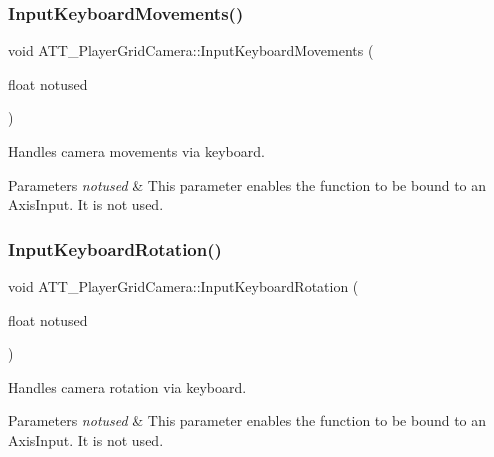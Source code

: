 \subsubsection{\texorpdfstring{InputKeyboardMovements()}{InputKeyboardMovements()}}
{\footnotesize\ttfamily void A\+T\+T\+\_\+\+Player\+Grid\+Camera\+::\+Input\+Keyboard\+Movements (\begin{DoxyParamCaption}\item[{float}]{notused }\end{DoxyParamCaption})\hspace{0.3cm}{\ttfamily [protected]}}



Handles camera movements via keyboard. 


\begin{DoxyParams}{Parameters}
{\em notused} & This parameter enables the function to be bound to an Axis\+Input. It is not used. \\
\hline
\end{DoxyParams}
\mbox{\label{class_a_t_t___player_grid_camera_aec7ff1bb18a7904e3a6d3e13253eae48}} 
\subsubsection{\texorpdfstring{InputKeyboardRotation()}{InputKeyboardRotation()}}
{\footnotesize\ttfamily void A\+T\+T\+\_\+\+Player\+Grid\+Camera\+::\+Input\+Keyboard\+Rotation (\begin{DoxyParamCaption}\item[{float}]{notused }\end{DoxyParamCaption})\hspace{0.3cm}{\ttfamily [protected]}}



Handles camera rotation via keyboard. 


\begin{DoxyParams}{Parameters}
{\em notused} & This parameter enables the function to be bound to an Axis\+Input. It is not used. \\
\hline
\end{DoxyParams}
\mbox{\label{class_a_t_t___player_grid_camera_adff10752fbd388a46227a42a2140d6d0}} 
